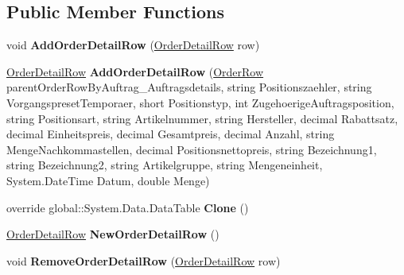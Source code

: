 \subsection*{Public Member Functions}
\begin{DoxyCompactItemize}
\item 
void {\bfseries Add\+Order\+Detail\+Row} (\hyperlink{class_products_1_1_data_1_1ds_sage_1_1_order_detail_row}{Order\+Detail\+Row} row)\hypertarget{class_products_1_1_data_1_1ds_sage_1_1_order_detail_data_table_a9ac5ebfac70bcac37187995ae179d328}{}\label{class_products_1_1_data_1_1ds_sage_1_1_order_detail_data_table_a9ac5ebfac70bcac37187995ae179d328}

\item 
\hyperlink{class_products_1_1_data_1_1ds_sage_1_1_order_detail_row}{Order\+Detail\+Row} {\bfseries Add\+Order\+Detail\+Row} (\hyperlink{class_products_1_1_data_1_1ds_sage_1_1_order_row}{Order\+Row} parent\+Order\+Row\+By\+Auftrag\+\_\+\+Auftragsdetails, string Positionszaehler, string Vorgangspreset\+Temporaer, short Positionstyp, int Zugehoerige\+Auftragsposition, string Positionsart, string Artikelnummer, string Hersteller, decimal Rabattsatz, decimal Einheitspreis, decimal Gesamtpreis, decimal Anzahl, string Menge\+Nachkommastellen, decimal Positionsnettopreis, string Bezeichnung1, string Bezeichnung2, string Artikelgruppe, string Mengeneinheit, System.\+Date\+Time Datum, double Menge)\hypertarget{class_products_1_1_data_1_1ds_sage_1_1_order_detail_data_table_a45e3d9f784723b619f316aa2a791706f}{}\label{class_products_1_1_data_1_1ds_sage_1_1_order_detail_data_table_a45e3d9f784723b619f316aa2a791706f}

\item 
override global\+::\+System.\+Data.\+Data\+Table {\bfseries Clone} ()\hypertarget{class_products_1_1_data_1_1ds_sage_1_1_order_detail_data_table_adf42d294688d7645835d96fd0c45a4ab}{}\label{class_products_1_1_data_1_1ds_sage_1_1_order_detail_data_table_adf42d294688d7645835d96fd0c45a4ab}

\item 
\hyperlink{class_products_1_1_data_1_1ds_sage_1_1_order_detail_row}{Order\+Detail\+Row} {\bfseries New\+Order\+Detail\+Row} ()\hypertarget{class_products_1_1_data_1_1ds_sage_1_1_order_detail_data_table_a6bf2672f76579145f73dcdf768d3f6c6}{}\label{class_products_1_1_data_1_1ds_sage_1_1_order_detail_data_table_a6bf2672f76579145f73dcdf768d3f6c6}

\item 
void {\bfseries Remove\+Order\+Detail\+Row} (\hyperlink{class_products_1_1_data_1_1ds_sage_1_1_order_detail_row}{Order\+Detail\+Row} row)\hypertarget{class_products_1_1_data_1_1ds_sage_1_1_order_detail_data_table_ae63b4b918358a576a2de29bf8b18181f}{}\label{class_products_1_1_data_1_1ds_sage_1_1_order_detail_data_table_ae63b4b918358a576a2de29bf8b18181f}

\end{DoxyCompactItemize}
